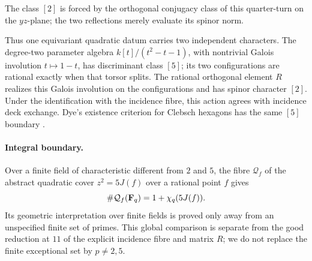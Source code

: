 The class \([2]\) is forced by the orthogonal conjugacy class of this
quarter-turn on the \(yz\)-plane; the two reflections merely evaluate its
spinor norm.

Thus one equivariant quadratic datum carries two independent characters.
The degree-two parameter algebra \(k[t]/(t^2-t-1)\), with nontrivial Galois involution
\(t\mapsto1-t\), has discriminant class \([5]\); its two configurations are
rational exactly when that torsor splits.  The rational orthogonal element
\(R\) realizes this Galois involution on the configurations and has spinor
character \([2]\).  Under the identification with the incidence fibre, this
action agrees with incidence deck exchange.  Dye's existence criterion for Clebsch hexagons has the same
\([5]\) boundary \cite[Theorem~1]{DyeClebsch}.

\paragraph{Integral boundary.}
Over a finite field of characteristic different from \(2\) and \(5\), the
fibre \(\mathcal Q_f\) of the abstract quadratic cover
\(z^2=5J(f)\) over a rational point \(f\) gives
\[
 \#\mathcal Q_f(\mathbf F_q)=1+\chi_q(5J(f)).
\]
Its geometric interpretation over finite fields is proved only away
from an unspecified finite set of primes.  This global comparison is
separate from the good reduction at \(11\) of the explicit incidence fibre and
matrix \(R\); we do not replace the finite exceptional set by
\(p\ne2,5\).
